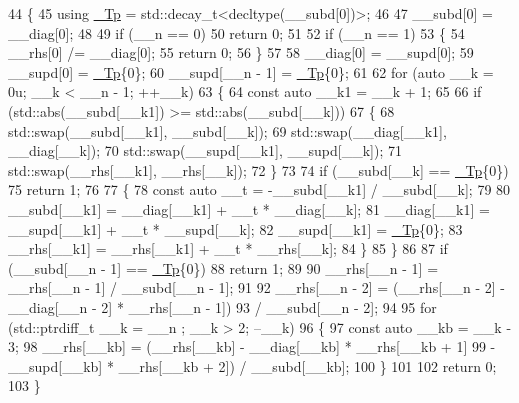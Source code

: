 \begin{DoxyCode}
44     \{
45       \textcolor{keyword}{using} \hyperlink{namespace____gnu__cxx_a3b19a9c800ca194374ef9172290f7d79}{\_Tp} = std::decay\_t<decltype(\_\_subd[0])>;
46 
47       \_\_subd[0] = \_\_diag[0];
48 
49       \textcolor{keywordflow}{if} (\_\_n == 0)
50         \textcolor{keywordflow}{return} 0;
51 
52       \textcolor{keywordflow}{if} (\_\_n == 1)
53         \{
54           \_\_rhs[0] /= \_\_diag[0];
55           \textcolor{keywordflow}{return} 0;
56         \}
57 
58       \_\_diag[0] = \_\_supd[0];
59       \_\_supd[0] = \hyperlink{namespace____gnu__cxx_a3b19a9c800ca194374ef9172290f7d79}{\_Tp}\{0\};
60       \_\_supd[\_\_n - 1] = \hyperlink{namespace____gnu__cxx_a3b19a9c800ca194374ef9172290f7d79}{\_Tp}\{0\};
61 
62       \textcolor{keywordflow}{for} (\textcolor{keyword}{auto} \_\_k = 0u; \_\_k < \_\_n - 1; ++\_\_k)
63         \{
64           \textcolor{keyword}{const} \textcolor{keyword}{auto} \_\_k1 = \_\_k + 1;
65 
66           \textcolor{keywordflow}{if} (std::abs(\_\_subd[\_\_k1]) >= std::abs(\_\_subd[\_\_k]))
67             \{
68               std::swap(\_\_subd[\_\_k1], \_\_subd[\_\_k]);
69               std::swap(\_\_diag[\_\_k1], \_\_diag[\_\_k]);
70               std::swap(\_\_supd[\_\_k1], \_\_supd[\_\_k]);
71               std::swap(\_\_rhs[\_\_k1], \_\_rhs[\_\_k]);
72             \}
73 
74           \textcolor{keywordflow}{if} (\_\_subd[\_\_k] == \hyperlink{namespace____gnu__cxx_a3b19a9c800ca194374ef9172290f7d79}{\_Tp}\{0\})
75             \textcolor{keywordflow}{return} 1;
76 
77           \{
78             \textcolor{keyword}{const} \textcolor{keyword}{auto} \_\_t = -\_\_subd[\_\_k1] / \_\_subd[\_\_k];
79 
80             \_\_subd[\_\_k1] = \_\_diag[\_\_k1] + \_\_t * \_\_diag[\_\_k];
81             \_\_diag[\_\_k1] = \_\_supd[\_\_k1] + \_\_t * \_\_supd[\_\_k];
82             \_\_supd[\_\_k1] = \hyperlink{namespace____gnu__cxx_a3b19a9c800ca194374ef9172290f7d79}{\_Tp}\{0\};
83             \_\_rhs[\_\_k1] = \_\_rhs[\_\_k1] + \_\_t * \_\_rhs[\_\_k];
84           \}
85         \}
86 
87       \textcolor{keywordflow}{if} (\_\_subd[\_\_n - 1] == \hyperlink{namespace____gnu__cxx_a3b19a9c800ca194374ef9172290f7d79}{\_Tp}\{0\})
88         \textcolor{keywordflow}{return} 1;
89 
90       \_\_rhs[\_\_n - 1] = \_\_rhs[\_\_n - 1] / \_\_subd[\_\_n - 1];
91 
92       \_\_rhs[\_\_n - 2] = (\_\_rhs[\_\_n - 2] - \_\_diag[\_\_n - 2] * \_\_rhs[\_\_n - 1])
93                      / \_\_subd[\_\_n - 2];
94 
95       \textcolor{keywordflow}{for} (std::ptrdiff\_t \_\_k = \_\_n ; \_\_k > 2; --\_\_k)
96         \{
97           \textcolor{keyword}{const} \textcolor{keyword}{auto} \_\_kb = \_\_k - 3;
98           \_\_rhs[\_\_kb] = (\_\_rhs[\_\_kb] - \_\_diag[\_\_kb] * \_\_rhs[\_\_kb + 1]
99                      - \_\_supd[\_\_kb] * \_\_rhs[\_\_kb + 2]) / \_\_subd[\_\_kb];
100         \}
101 
102       \textcolor{keywordflow}{return} 0;
103     \}
\end{DoxyCode}
\mbox{\label{namespace____gnu__cxx_a4b9501d94b3eebf5f1ffe990b81cae93}} 
